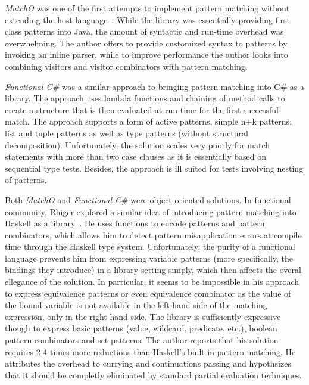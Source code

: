 \emph{MatchO} was one of the first attempts to implement pattern matching without 
extending the host language~\cite{Visser06matchingobjects}. While the library 
was essentially providing first class patterns into Java, the amount of 
syntactic and run-time overhead was overwhelming. The author offers to provide 
customized syntax to patterns by invoking an inline parser, while to improve 
performance the author looks into combining visitors and visitor combinators 
with pattern matching. %

\emph{Functional C\#} was a similar approach to bringing pattern matching into 
C\# as a library\cite{FuncCSharp}. The approach uses lambda functions and 
chaining of method calls to create a structure that is then evaluated at 
run-time for the first successful match. The approach supports a form of 
active patterns, simple n+k patterns, list and tuple patterns as well as type 
patterns (without structural decomposition). Unfortunately, the solution scales 
very poorly for match statements with more than two case clauses as it is 
essentially based on sequential type tests. Besides, the approach is ill suited 
for tests involving nesting of patterns.

Both \emph{MatchO} and \emph{Functional C\#} were object-oriented solutions. In 
functional community, Rhiger explored a similar idea of introducing pattern 
matching into Haskell as a library~\cite{Rhiger09}. He uses functions to encode 
patterns and pattern combinators, which allows him to detect pattern 
misapplication errors at compile time through the Haskell type system. 
Unfortunately, the purity of a functional language prevents him from expressing 
variable patterns (more specifically, the bindings they introduce) in a library 
setting simply, which then affects the overal ellegance of the solution. In 
particular, it seems to be impossible in his approach to express equivalence 
patterns or even equivalence combinator as the value of the bound variable is 
not available in the left-hand side of the matching expression, only in the 
right-hand side. The library is sufficiently expressive though to express basic 
patterns (value, wildcard, predicate, etc.), boolean pattern combinators and set 
patterns. The author reports that his solution requires 2-4 times more 
reductions than Haskell's built-in pattern matching. He attributes the overhead 
to currying and continuations passing and hypothsizes that it should be completly 
eliminated by standard partial evaluation techniques.


